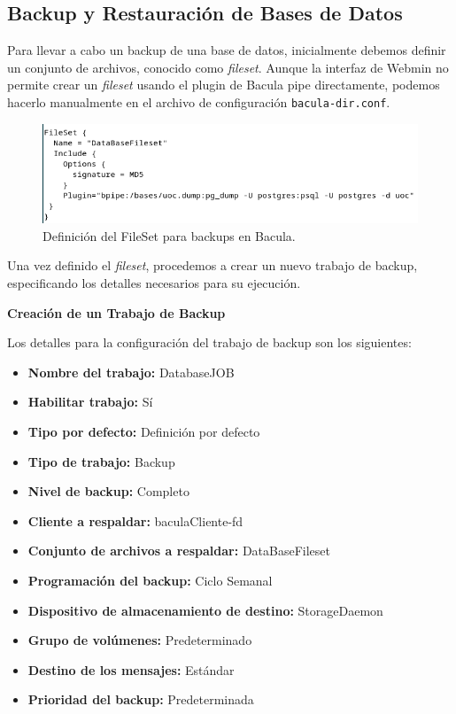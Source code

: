 \subsection{Backup y Restauración de Bases de Datos}

Para llevar a cabo un backup de una base de datos, inicialmente debemos definir un conjunto de archivos, conocido como \textit{fileset}. Aunque la interfaz de Webmin no permite crear un \textit{fileset} usando el plugin de Bacula pipe directamente, podemos hacerlo manualmente en el archivo de configuración \texttt{bacula-dir.conf}.

\begin{figure}[H]
    \centering
    \includegraphics[width=0.5\linewidth]{instalacionBacula/filesetBpipe.png}
    \caption{Definición del FileSet para backups en Bacula.}
\end{figure}

Una vez definido el \textit{fileset}, procedemos a crear un nuevo trabajo de backup, especificando los detalles necesarios para su ejecución.

\textbf{Creación de un Trabajo de Backup}\medskip

Los detalles para la configuración del trabajo de backup son los siguientes:

\begin{itemize}
    \item \textbf{Nombre del trabajo:} DatabaseJOB
    \item \textbf{Habilitar trabajo:} Sí
    \item \textbf{Tipo por defecto:} Definición por defecto
    \item \textbf{Tipo de trabajo:} Backup
    \item \textbf{Nivel de backup:} Completo
    \item \textbf{Cliente a respaldar:} baculaCliente-fd
    \item \textbf{Conjunto de archivos a respaldar:} DataBaseFileset
    \item \textbf{Programación del backup:} Ciclo Semanal
    \item \textbf{Dispositivo de almacenamiento de destino:} StorageDaemon
    \item \textbf{Grupo de volúmenes:} Predeterminado
    \item \textbf{Destino de los mensajes:} Estándar
    \item \textbf{Prioridad del backup:} Predeterminada
\end{itemize}

